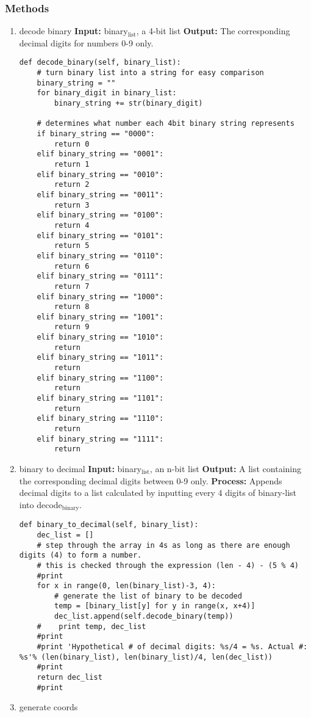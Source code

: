\documentclass[a4paper]{article}
\begin{document}
\subsubsection{Methods}
\label{sec-5-2-1}
\begin{enumerate}
\item decode binary
\label{sec-5-2-1-1}
\textbf{Input:} binary$_{\text{list}}$, a 4-bit list
\textbf{Output:} The corresponding decimal digits for numbers 0-9 only.
\begin{verbatim}
def decode_binary(self, binary_list):
    # turn binary list into a string for easy comparison
    binary_string = ""
    for binary_digit in binary_list:
        binary_string += str(binary_digit)

    # determines what number each 4bit binary string represents
    if binary_string == "0000":
        return 0
    elif binary_string == "0001":
        return 1
    elif binary_string == "0010":
        return 2
    elif binary_string == "0011":
        return 3
    elif binary_string == "0100":
        return 4
    elif binary_string == "0101":
        return 5
    elif binary_string == "0110":
        return 6
    elif binary_string == "0111":
        return 7
    elif binary_string == "1000":
        return 8
    elif binary_string == "1001":
        return 9
    elif binary_string == "1010":
        return
    elif binary_string == "1011":
        return
    elif binary_string == "1100":
        return
    elif binary_string == "1101":
        return
    elif binary_string == "1110":
        return
    elif binary_string == "1111":
        return
\end{verbatim}
\item binary to decimal
\label{sec-5-2-1-2}
\textbf{Input:} binary$_{\text{list}}$, an n-bit list
\textbf{Output:} A list containing the corresponding decimal digits between 0-9 only.
\textbf{Process:} Appends decimal digits to a list calculated by inputting every 4 digits of binary-list into decode$_{\text{binary}}$.
\begin{verbatim}
def binary_to_decimal(self, binary_list):
    dec_list = []
    # step through the array in 4s as long as there are enough digits (4) to form a number.
    # this is checked through the expression (len - 4) - (5 % 4)
    #print
    for x in range(0, len(binary_list)-3, 4):
        # generate the list of binary to be decoded
        temp = [binary_list[y] for y in range(x, x+4)]
        dec_list.append(self.decode_binary(temp))
    #    print temp, dec_list 
    #print
    #print 'Hypothetical # of decimal digits: %s/4 = %s. Actual #: %s'% (len(binary_list), len(binary_list)/4, len(dec_list))
    #print
    return dec_list
    #print
\end{verbatim}
\item generate coords
\label{sec-5-2-1-3}


\end{enumerate}
\end{document}
